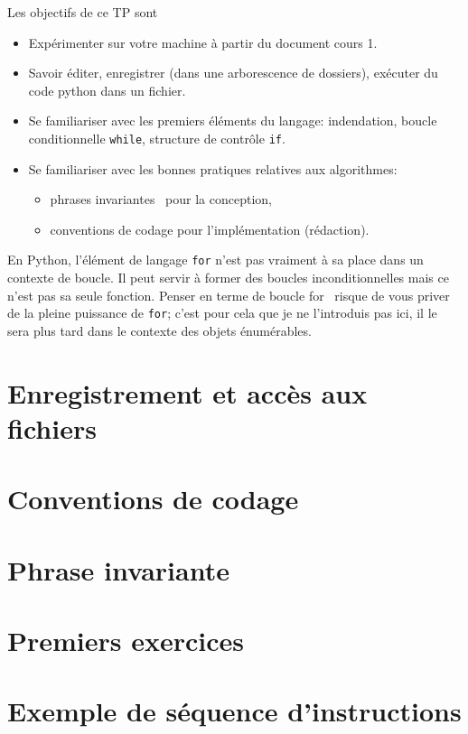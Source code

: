 

\usepackage{parcolumns}
\setlength{\parindent}{0pt}

 
Les objectifs de ce TP sont
\begin{itemize}
  \item Expérimenter sur votre machine à partir du document \og cours 1\fg.
  \item  Savoir éditer, enregistrer (dans une arborescence de dossiers), exécuter du code python dans un fichier.
  \item Se familiariser avec les premiers éléments du langage: indendation, boucle conditionnelle \texttt{while}, structure de contrôle \texttt{if}.
  \item Se familiariser avec les bonnes pratiques relatives aux algorithmes:
  \begin{itemize}
    \item \og phrases invariantes\fg~ pour la conception,
    \item conventions de codage pour l'implémentation (rédaction).
  \end{itemize} 
\end{itemize}
En Python, l'élément de langage \texttt{for} n'est pas vraiment à sa place dans un contexte de boucle. Il peut servir à former des boucles inconditionnelles mais ce n'est pas sa seule fonction. Penser en terme de \og boucle for\fg~ risque de vous priver de la pleine puissance de \texttt{for}; c'est pour cela que je ne l'introduis pas ici, il le sera plus tard dans le contexte des objets \og énumérables\fg.


\section{Enregistrement et accès aux fichiers}


\section{Conventions de codage}


\section{Phrase invariante}


\section{Premiers exercices}


\section{Exemple de séquence d'instructions}



